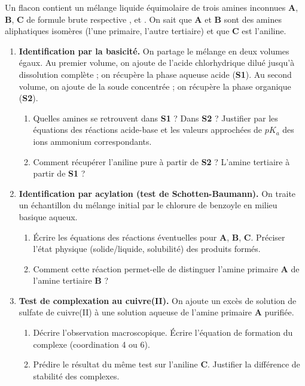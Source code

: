 \documentclass[11pt]{article}
\begin{document}
\begin{exercice}
Un flacon contient un mélange liquide équimolaire de trois amines inconnues \textbf{A}, \textbf{B}, \textbf{C} de formule brute respective ,  et . On sait que \textbf{A} et \textbf{B} sont des amines aliphatiques isomères (l'une primaire, l'autre tertiaire) et que \textbf{C} est l'aniline.
\begin{enumerate}
    \item \textbf{Identification par la basicité.} On partage le mélange en deux volumes égaux. Au premier volume, on ajoute de l'acide chlorhydrique dilué jusqu'à dissolution complète ; on récupère la phase aqueuse acide (\textbf{S1}). Au second volume, on ajoute de la soude concentrée ; on récupère la phase organique (\textbf{S2}).
    \begin{enumerate}
        \item Quelles amines se retrouvent dans \textbf{S1} ? Dans \textbf{S2} ? Justifier par les équations des réactions acide-base et les valeurs approchées de $pK_a$ des ions ammonium correspondants.
        \item Comment récupérer l'aniline pure à partir de \textbf{S2} ? L'amine tertiaire à partir de \textbf{S1} ?
    \end{enumerate}
    \item \textbf{Identification par acylation (test de Schotten-Baumann).} On traite un échantillon du mélange initial par le chlorure de benzoyle  en milieu basique aqueux.
    \begin{enumerate}
        \item Écrire les équations des réactions éventuelles pour \textbf{A}, \textbf{B}, \textbf{C}. Préciser l'état physique (solide/liquide, solubilité) des produits formés.
        \item Comment cette réaction permet-elle de distinguer l'amine primaire \textbf{A} de l'amine tertiaire \textbf{B} ?
    \end{enumerate}
    \item \textbf{Test de complexation au cuivre(II).} On ajoute un excès de solution de sulfate de cuivre(II) à une solution aqueuse de l'amine primaire \textbf{A} purifiée.
    \begin{enumerate}
        \item Décrire l'observation macroscopique. Écrire l'équation de formation du complexe (coordination 4 ou 6).
        \item Prédire le résultat du même test sur l'aniline \textbf{C}. Justifier la différence de stabilité des complexes.

\end{enumerate}
\end{enumerate}
\end{exercice}
\end{document}
